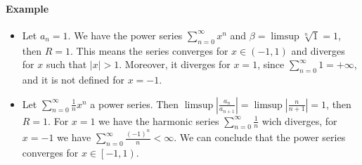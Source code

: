 \documentclass{article}
\newcommand{\abs}[1]{\left|#1\right|}
\newcommand{\DS}{\displaystyle}
\newcommand{\pseries}[1]{\sum_{n=0}^\infty #1}
\newcommand{\intco}[1]{\left[#1\right)}
\newcommand{\intoo}[1]{\left(#1\right)}
\newcommand{\Example}{\paragraph{Example}}
\begin{document}
	\Example
	\begin{itemize}
		\item %
		Let $a_n = 1$. We have the power series $\DS \pseries{x^n}$ and $\beta =
		\limsup \sqrt[n]{1} = 1$, then $R = 1$. This means the series converges for
		$x \in \intoo{-1,1}$ and diverges for $x$ such that $|x| > 1$. Moreover, it
		diverges for $x = 1$, since $\DS \pseries{1} = +\infty$, and it is not
		defined for $x = -1$.

		\item %
		Let $\DS \pseries{\frac{1}{n}x^n}$ a power series. Then $\limsup
		\abs{\frac{a_n}{a_{n+1}}} = \limsup \abs{\frac{n}{n+1}} = 1$, then $R = 1$.
		For $x = 1$ we have the harmonic series $\DS \pseries{\frac{1}{n}}$ wich
		diverges, for $x = -1$ we have $\DS \pseries{\frac{(-1)^n}{n}} < \infty$. We
		can conclude that the power series converges for $x \in \intco{-1,1}$.
	\end{itemize}

\end{document}
